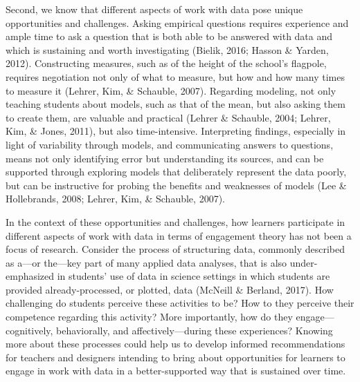 \documentclass[]{msu-thesis}
\theoremstyle{definition}
\theoremstyle{definition}
\theoremstyle{definition}
\theoremstyle{remark}
\begin{document}
Second, we know that different aspects of work with data pose unique
opportunities and challenges. Asking empirical questions requires
experience and ample time to ask a question that is both able to be
answered with data and which is sustaining and worth investigating
(Bielik, 2016; Hasson \& Yarden, 2012). Constructing measures, such as
of the height of the school's flagpole, requires negotiation not only of
what to measure, but how and how many times to measure it (Lehrer, Kim,
\& Schauble, 2007). Regarding modeling, not only teaching students about
models, such as that of the mean, but also asking them to create them,
are valuable and practical (Lehrer \& Schauble, 2004; Lehrer, Kim, \&
Jones, 2011), but also time-intensive. Interpreting findings, especially
in light of variability through models, and communicating answers to
questions, means not only identifying error but understanding its
sources, and can be supported through exploring models that deliberately
represent the data poorly, but can be instructive for probing the
benefits and weaknesses of models (Lee \& Hollebrands, 2008; Lehrer,
Kim, \& Schauble, 2007).

In the context of these opportunities and challenges, how learners
participate in different aspects of work with data in terms of
engagement theory has not been a focus of research. Consider the process
of structuring data, commonly described as a---or the---key part of many
applied data analyses, that is also under-emphasized in students' use of
data in science settings in which students are provided
already-processed, or plotted, data (McNeill \& Berland, 2017). How
challenging do students perceive these activities to be? How to they
perceive their competence regarding this activity? More importantly, how
do they engage---cognitively, behaviorally, and affectively---during
these experiences? Knowing more about these processes could help us to
develop informed recommendations for teachers and designers intending to
bring about opportunities for learners to engage in work with data in a
better-supported way that is sustained over time.
\end{document}
